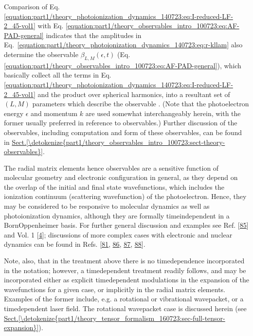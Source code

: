 \documentclass[letterpaper,table,10pt,english]{jupyterBook}
\begin{document}
\sphinxAtStartPar
Comparison of Eq. \eqref{equation:part1/theory_photoionization_dynamics_140723:eq:I-reduced-LF-2_45-vol1} with Eq. \eqref{equation:part1/theory_observables_intro_100723:eq:AF-PAD-general} indicates that the amplitudes
in Eq. \eqref{equation:part1/theory_photoionization_dynamics_140723:eq:r-kllam} also determine the observable {\hyperref[\detokenize{backmatter/glossary:term-anisotropy-paramters}]{}} \(\beta_{L,M}(\epsilon,t)\) (Eq.
\eqref{equation:part1/theory_observables_intro_100723:eq:AF-PAD-general}), which basically collect all the terms in Eq. \eqref{equation:part1/theory_photoionization_dynamics_140723:eq:I-reduced-LF-2_45-vol1} and the product over spherical harmonics, into a resultant set of \((L,M)\) parameters which describe the observable {\hyperref[\detokenize{backmatter/glossary:term-PADs}]{}}. (Note that the photoelectron energy
\(\epsilon\) and momentum \(k\) are used somewhat interchangeably herein,
with the former usually preferred in reference to observables.) Further discussion of the observables, including computation and form of these observables, can be found in \hyperref[\detokenize{part1/theory_observables_intro_100723:sect-theory-observables}]{Sect.\@ \ref{\detokenize{part1/theory_observables_intro_100723:sect-theory-observables}}}.

\sphinxAtStartPar
The radial matrix elements \sphinxhyphen{} hence observables \sphinxhyphen{} are
a sensitive function of molecular geometry and electronic configuration
in general, as they depend on the overlap of the initial and final state wavefunctions, which includes the ionization continuum (scattering wavefunction) of the photoelectron.
Hence, they may be considered to be responsive to molecular
dynamics as well as photoionization dynamics, although they are formally time\sphinxhyphen{}independent in a
Born\sphinxhyphen{}Oppenheimer basis. For further general discussion and examples see
Ref. {[}\hyperlink{cite.backmatter/bibliography:id974}{85}{]} and  Vol. 1 {[}\hyperlink{cite.backmatter/bibliography:id677}{4}{]}; discussions of more
complex cases with electronic and nuclear dynamics can be found in Refs.
{[}\hyperlink{cite.backmatter/bibliography:id883}{81}, \hyperlink{cite.backmatter/bibliography:id512}{86}, \hyperlink{cite.backmatter/bibliography:id910}{87}, \hyperlink{cite.backmatter/bibliography:id907}{88}{]}.

\sphinxAtStartPar
Note, also, that in the treatment above there is no time\sphinxhyphen{}dependence
incorporated in the notation; however, a time\sphinxhyphen{}dependent treatment
readily follows, and may be incorporated either as explicit
time\sphinxhyphen{}dependent modulations in the expansion of the wavefunctions for a
given case, or implicitly in the radial matrix elements. Examples of the
former include, e.g. a rotational or vibrational wavepacket, or a
time\sphinxhyphen{}dependent laser field. The rotational wavepacket case is discussed
herein (see \hyperref[\detokenize{part1/theory_tensor_formalism_160723:sec-full-tensor-expansion}]{Sect.\@ \ref{\detokenize{part1/theory_tensor_formalism_160723:sec-full-tensor-expansion}}}).
\end{document}
